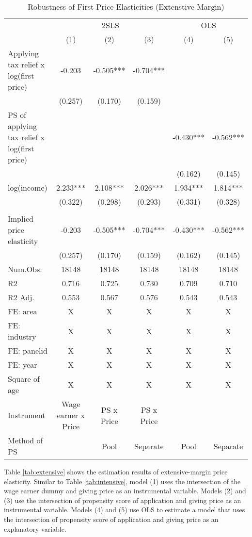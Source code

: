 \documentclass[
  11pt,
  a4paper,
]{article}
\begin{document}
\begin{table}

\caption{\label{tab:robextensive}Robustness of First-Price Elasticities (Extenstive Margin)}
\centering
\begin{tabular}[t]{lccccc}
\toprule
\multicolumn{1}{c}{ } & \multicolumn{3}{c}{2SLS} & \multicolumn{2}{c}{OLS} \\
\cmidrule(l{3pt}r{3pt}){2-4} \cmidrule(l{3pt}r{3pt}){5-6}
  & (1) & (2) & (3) & (4) & (5)\\
\midrule
Applying tax relief x log(first price) & -0.203 & -0.505*** & -0.704*** &  & \\
 & (0.257) & (0.170) & (0.159) &  & \\
PS of applying tax relief x log(first price) &  &  &  & -0.430*** & -0.562***\\
 &  &  &  & (0.162) & (0.145)\\
log(income) & 2.233*** & 2.108*** & 2.026*** & 1.934*** & 1.814***\\
 & (0.322) & (0.298) & (0.293) & (0.331) & (0.328)\\
\midrule
 &  &  &  &  & \\
Implied price elasticity & -0.203 & -0.505*** & -0.704*** & -0.430*** & -0.562***\\
 & (0.257) & (0.170) & (0.159) & (0.162) & (0.145)\\
Num.Obs. & 18148 & 18148 & 18148 & 18148 & 18148\\
R2 & 0.716 & 0.725 & 0.730 & 0.709 & 0.710\\
R2 Adj. & 0.553 & 0.567 & 0.576 & 0.543 & 0.543\\
FE: area & X & X & X & X & X\\
FE: industry & X & X & X & X & X\\
FE: panelid & X & X & X & X & X\\
FE: year & X & X & X & X & X\\
Square of age & X & X & X & X & X\\
Instrument & Wage earner x Price & PS x Price & PS x Price &  & \\
Method of PS &  & Pool & Separate & Pool & Separate\\
\bottomrule
\end{tabular}
\end{table}

Table \ref{tab:extensive} shows
the estimation results of extensive-margin price elasticity.
Similar to Table \ref{tab:intensive},
model (1) uses the intersection of the wage earner dummy and
giving price as an instrumental variable.
Models (2) and (3) use the intersection of propensity score of application
and giving price as an instrumental variable.
Models (4) and (5) use OLS to estimate a model that
uses the intersection of propensity score of application and
giving price as an explanatory variable.
\end{document}
